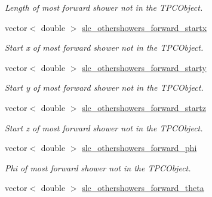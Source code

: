\begin{DoxyCompactItemize}
\begin{DoxyCompactList}\small\item\em Length of most forward shower not in the T\-P\-C\-Object. \end{DoxyCompactList}\item 
\hypertarget{classUBXSecEvent_a81105357facd42aa6807e4e75158cbb2}{vector$<$ double $>$ \hyperlink{classUBXSecEvent_a81105357facd42aa6807e4e75158cbb2}{slc\-\_\-othershowers\-\_\-forward\-\_\-startx}}\label{classUBXSecEvent_a81105357facd42aa6807e4e75158cbb2}

\begin{DoxyCompactList}\small\item\em Start x of most forward shower not in the T\-P\-C\-Object. \end{DoxyCompactList}\item 
\hypertarget{classUBXSecEvent_acae6b15c69e2c24b2a303a2b78f53082}{vector$<$ double $>$ \hyperlink{classUBXSecEvent_acae6b15c69e2c24b2a303a2b78f53082}{slc\-\_\-othershowers\-\_\-forward\-\_\-starty}}\label{classUBXSecEvent_acae6b15c69e2c24b2a303a2b78f53082}

\begin{DoxyCompactList}\small\item\em Start y of most forward shower not in the T\-P\-C\-Object. \end{DoxyCompactList}\item 
\hypertarget{classUBXSecEvent_aaf0aff9ad8744f108a8f65e622aa9892}{vector$<$ double $>$ \hyperlink{classUBXSecEvent_aaf0aff9ad8744f108a8f65e622aa9892}{slc\-\_\-othershowers\-\_\-forward\-\_\-startz}}\label{classUBXSecEvent_aaf0aff9ad8744f108a8f65e622aa9892}

\begin{DoxyCompactList}\small\item\em Start z of most forward shower not in the T\-P\-C\-Object. \end{DoxyCompactList}\item 
\hypertarget{classUBXSecEvent_adf057c48d3af2b21664662c2921ea32a}{vector$<$ double $>$ \hyperlink{classUBXSecEvent_adf057c48d3af2b21664662c2921ea32a}{slc\-\_\-othershowers\-\_\-forward\-\_\-phi}}\label{classUBXSecEvent_adf057c48d3af2b21664662c2921ea32a}

\begin{DoxyCompactList}\small\item\em Phi of most forward shower not in the T\-P\-C\-Object. \end{DoxyCompactList}\item 
\hypertarget{classUBXSecEvent_a6aee218613c7b148852b5ccca813b42b}{vector$<$ double $>$ \hyperlink{classUBXSecEvent_a6aee218613c7b148852b5ccca813b42b}{slc\-\_\-othershowers\-\_\-forward\-\_\-theta}}\label{classUBXSecEvent_a6aee218613c7b148852b5ccca813b42b}


\end{DoxyCompactItemize}
